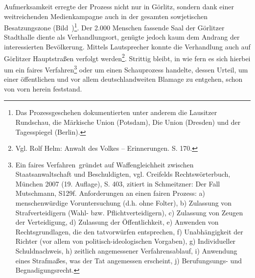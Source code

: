\documentclass[a4paper,12pt,ngerman,
]{nisebook}
\begin{document}
Aufmerksamkeit erregte der Prozess nicht nur in Görlitz, sondern dank einer weitreichenden Medienkampagne auch in der gesamten sowjetischen Besatzungszone (Bild~)\footnote{Das Prozessgeschehen dokumentierten unter anderem die Lausitzer Rundschau, die Märkische Union (Potsdam), Die Union (Dresden) und der Tagesspiegel (Berlin).}. Der 2.000 Menschen fassende Saal der Görlitzer Stadthalle diente als Verhandlungsort, genügte jedoch kaum dem Andrang der interessierten Bevölkerung. Mittels Lautsprecher konnte die Verhandlung auch auf Görlitzer Hauptstraßen verfolgt werden\footnote{Vgl. Rolf Helm: Anwalt des Volkes -- Erinnerungen. S. 170.}. Strittig bleibt, in wie fern es sich hierbei um ein faires Verfahren\footnote{Ein \glqq faires Verfahren\grqq~gründet auf Waffengleichheit zwischen Staatsanwaltschaft und Beschuldigten, vgl. Creifelds Rechtswörterbuch, München 2007 (19. Auflage), S. 403, zitiert in Schmeitzner: Der Fall Mutschmann, S129f. Anforderungen an einen fairen Prozess: 
a) menschenwürdige Voruntersuchung (d.h. ohne Folter), b) Zulassung von Strafverteidigern (Wahl- bzw. Pflichtverteidigern), c) Zulassung von Zeugen der Verteidigung, d) Zulassung der Öffentlichkeit, e) Anwenden von Rechtsgrundlagen, die den tatvorwürfen entsprechen, f) Unabhängigkeit der Richter (vor allem von politisch-ideologischen Vorgaben), g) Individueller Schuldnachweis, h) zeitlich angemessener Verfahrensablauf, i) Anwendung eines Strafmaßes, was der Tat angemessen erscheint, j) Berufungsungs- und Begnadigungsrecht.} oder um einen Schauprozess handelte, dessen Urteil, um einer öffentlichen und vor allem deutschlandweiten Blamage zu entgehen, schon von vorn herein feststand.\newline 
\end{document}
